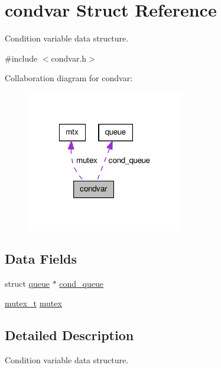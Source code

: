 \hypertarget{structcondvar}{\section{condvar Struct Reference}
\label{structcondvar}
}


Condition variable data structure.  




{\ttfamily \#include $<$condvar.\-h$>$}



Collaboration diagram for condvar\-:\nopagebreak
\begin{figure}[H]
\begin{center}
\leavevmode
\includegraphics[width=195pt]{structcondvar__coll__graph}
\end{center}
\end{figure}
\subsection*{Data Fields}
\begin{DoxyCompactItemize}
\item 
struct \hyperlink{structqueue}{queue} $\ast$ \hyperlink{structcondvar_abf91dd97763d95af19ee92a17f55afb8}{cond\-\_\-queue}
\item 
\hyperlink{mutex_8h_a5d47ad3a25c2df1eecad005e0649a431}{mutex\-\_\-t} \hyperlink{structcondvar_a573f1b5d528d692d581b734913807b66}{mutex}
\end{DoxyCompactItemize}


\subsection{Detailed Description}
Condition variable data structure. 

